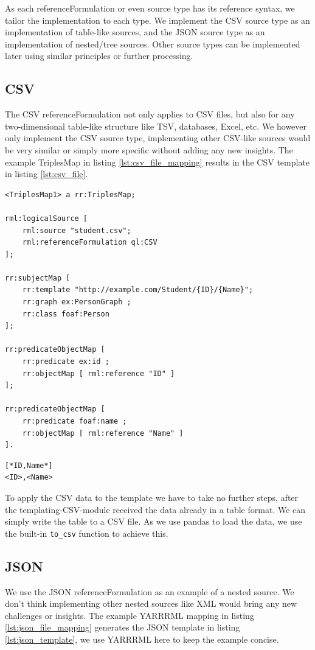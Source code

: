 As each referenceFormulation or even source type has its reference syntax, we tailor the implementation to each type. We implement the CSV source type as an implementation of table-like sources, and the JSON source type as an implementation of nested/tree sources. Other source types can be implemented later using similar principles or further processing.

\subsection{CSV}
\label{subsection:csv}
The CSV referenceFormulation not only applies to CSV files, but also for any two-dimensional table-like structure like TSV, databases, Excel, etc. We however only implement the CSV source type, implementing other CSV-like sources would be very similar or simply more specific without adding any new insights. The example TriplesMap in listing \ref{lst:csv_file_mapping} results in the CSV template in listing \ref{lst:csv_file}.

\begin{lstlisting}[caption={Example mapping for a CSV file}, label={lst:csv_file_mapping}, captionpos=b, basicstyle=\small]
<TriplesMap1> a rr:TriplesMap;

rml:logicalSource [
    rml:source "student.csv";
    rml:referenceFormulation ql:CSV
];

rr:subjectMap [ 
    rr:template "http://example.com/Student/{ID}/{Name}";
    rr:graph ex:PersonGraph ;
    rr:class foaf:Person
];

rr:predicateObjectMap [ 
    rr:predicate ex:id ; 
    rr:objectMap [ rml:reference "ID" ]
];

rr:predicateObjectMap [ 
    rr:predicate foaf:name ; 
    rr:objectMap [ rml:reference "Name" ]
].
\end{lstlisting}

\begin{lstlisting}[caption={Example CSV template}, label={lst:csv_file}, captionpos=b, basicstyle=\small]
[*ID,Name*]
<ID>,<Name>
\end{lstlisting}

To apply the CSV data to the template we have to take no further steps, after the templating-CSV-module received the data already in a table format. We can simply write the table to a CSV file. As we use pandas to load the data, we use the built-in \texttt{to\_csv} function to achieve this. 

\subsection{JSON}
\label{subsection:json}
We use the JSON referenceFormulation as an example of a nested source. We don't think implementing other nested sources like XML would bring any new challenges or insights. 
The example YARRRML mapping in listing \ref{lst:json_file_mapping} generates the JSON template in listing \ref{lst:json_template}, we use YARRRML here to keep the example concise.

